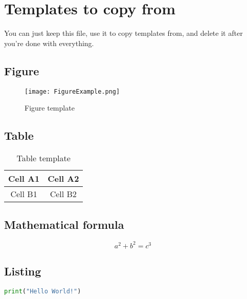 \chapter*{Templates to copy from}

You can just keep this file, use it to copy templates from, and delete it after you're done with everything.





\section*{Figure}

\begin{figure}[H]
    \centering
    \texttt{[image: FigureExample.png]}
    \caption{Figure template}
    \label{fig:template}
\end{figure}





\section*{Table}

\begin{table}[H]
    \centering
    \caption{Table template}
    \label{tab:template}
    \begin{tabular}{|c|c|}
        \hline
        Cell A1 & Cell A2 \\
        \hline
        Cell B1 & Cell B2 \\
        \hline
    \end{tabular}
\end{table}





\section*{Mathematical formula}

\begin{equation}\label{eq:template}
a^2 + b^2 = c^3
\end{equation}




\section*{Listing}

\begin{lstlisting}[caption=Listing template, label=lst:template, language=Python]
print("Hello World!")
\end{lstlisting}